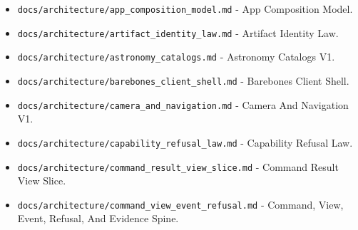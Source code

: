 \documentclass[9pt,a4paper,openany]{book}
\begin{document}
\begin{itemize}
\item \texttt{docs/\allowbreak{}architecture/\allowbreak{}app\_\allowbreak{}composition\_\allowbreak{}model.\allowbreak{}md} -\allowbreak{} App Composition Model.\allowbreak{}
\end{itemize}

\begin{itemize}
\item \texttt{docs/\allowbreak{}architecture/\allowbreak{}artifact\_\allowbreak{}identity\_\allowbreak{}law.\allowbreak{}md} -\allowbreak{} Artifact Identity Law.\allowbreak{}
\end{itemize}

\begin{itemize}
\item \texttt{docs/\allowbreak{}architecture/\allowbreak{}astronomy\_\allowbreak{}catalogs.\allowbreak{}md} -\allowbreak{} Astronomy Catalogs V1.\allowbreak{}
\end{itemize}

\begin{itemize}
\item \texttt{docs/\allowbreak{}architecture/\allowbreak{}barebones\_\allowbreak{}client\_\allowbreak{}shell.\allowbreak{}md} -\allowbreak{} Barebones Client Shell.\allowbreak{}
\end{itemize}

\begin{itemize}
\item \texttt{docs/\allowbreak{}architecture/\allowbreak{}camera\_\allowbreak{}and\_\allowbreak{}navigation.\allowbreak{}md} -\allowbreak{} Camera And Navigation V1.\allowbreak{}
\end{itemize}

\begin{itemize}
\item \texttt{docs/\allowbreak{}architecture/\allowbreak{}capability\_\allowbreak{}refusal\_\allowbreak{}law.\allowbreak{}md} -\allowbreak{} Capability Refusal Law.\allowbreak{}
\end{itemize}

\begin{itemize}
\item \texttt{docs/\allowbreak{}architecture/\allowbreak{}command\_\allowbreak{}result\_\allowbreak{}view\_\allowbreak{}slice.\allowbreak{}md} -\allowbreak{} Command Result View Slice.\allowbreak{}
\end{itemize}

\begin{itemize}
\item \texttt{docs/\allowbreak{}architecture/\allowbreak{}command\_\allowbreak{}view\_\allowbreak{}event\_\allowbreak{}refusal.\allowbreak{}md} -\allowbreak{} Command, View, Event, Refusal, And Evidence Spine.\allowbreak{}
\end{itemize}
\end{document}
